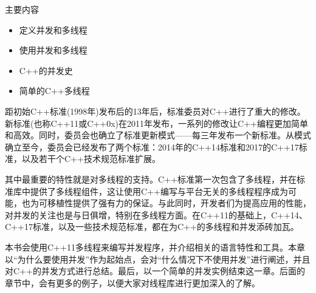 主要内容

\begin{itemize}
    \item 定义并发和多线程
    \item 使用并发和多线程
    \item C++的并发史
    \item 简单的C++多线程
\end{itemize}

距初始C++标准(1998年)发布后的13年后，标准委员对C++进行了重大的修改。新标准(也称C++11或C++0x)在2011年发布，一系列的修改让C++编程更加简单和高效。同时，委员会也确立了标准更新模式——每三年发布一个新标准。从模式确立至今，委员会已经发布了两个标准：2014年的C++14标准和2017的C++17标准，以及若干个C++技术规范标准扩展。

其中最重要的特性就是对多线程的支持。C++标准第一次包含了多线程，并在标准库中提供了多线程组件，这让使用C++编写与平台无关的多线程程序成为可能，也为可移植性提供了强有力的保证。与此同时，开发者们为提高应用的性能，对并发的关注也是与日俱增，特别在多线程方面。在C++11的基础上，C++14、C++17标准，以及一些技术规范标准，都在为C++的多线程和并发添砖加瓦。

本书会使用C++11多线程来编写并发程序，并介绍相关的语言特性和工具。本章以“为什么要使用并发”作为起始点，会对“什么情况下不使用并发”进行阐述，并且对C++的并发方式进行总结。最后，以一个简单的并发实例结束这一章。后面的章节中，会有更多的例子，以便大家对线程库进行更加深入的了解。